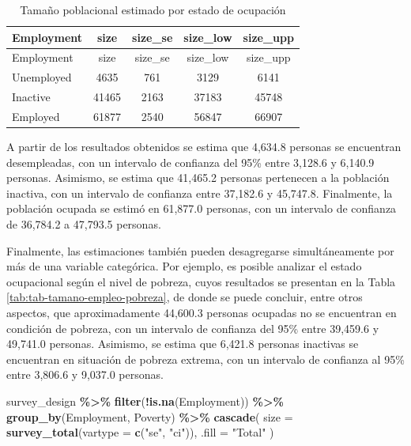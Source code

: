 \documentclass[
  spanish,
  12pt,
]{book}
\newenvironment{Shaded}{\begin{snugshade}}{\end{snugshade}}
\newcommand{\AttributeTok}[1]{\textcolor[rgb]{0.13,0.29,0.53}{#1}}
\newcommand{\FunctionTok}[1]{\textcolor[rgb]{0.13,0.29,0.53}{\textbf{#1}}}
\newcommand{\NormalTok}[1]{#1}
\newcommand{\SpecialCharTok}[1]{\textcolor[rgb]{0.81,0.36,0.00}{\textbf{#1}}}
\newcommand{\StringTok}[1]{\textcolor[rgb]{0.31,0.60,0.02}{#1}}
\begin{document}
\begin{longtable}[]{@{}lcccc@{}}
\caption{\label{tab:tab-tamano-empleo}Tamaño poblacional estimado por estado de ocupación}\tabularnewline
\toprule\noalign{}
Employment & size & size\_se & size\_low & size\_upp \\
\midrule\noalign{}
\endfirsthead
\toprule\noalign{}
Employment & size & size\_se & size\_low & size\_upp \\
\midrule\noalign{}
\endhead
\bottomrule\noalign{}
\endlastfoot
Unemployed & 4635 & 761 & 3129 & 6141 \\
Inactive & 41465 & 2163 & 37183 & 45748 \\
Employed & 61877 & 2540 & 56847 & 66907 \\
\end{longtable}

A partir de los resultados obtenidos se estima que 4,634.8 personas se encuentran desempleadas, con un intervalo de confianza del 95\% entre 3,128.6 y 6,140.9 personas. Asimismo, se estima que 41,465.2 personas pertenecen a la población inactiva, con un intervalo de confianza entre 37,182.6 y 45,747.8. Finalmente, la población ocupada se estimó en 61,877.0 personas, con un intervalo de confianza de 36,784.2 a 47,793.5 personas.

Finalmente, las estimaciones también pueden desagregarse simultáneamente por más de una variable categórica. Por ejemplo, es posible analizar el estado ocupacional según el nivel de pobreza, cuyos resultados se presentan en la Tabla \ref{tab:tab-tamano-empleo-pobreza}, de donde se puede concluir, entre otros aspectos, que aproximadamente 44,600.3 personas ocupadas no se encuentran en condición de pobreza, con un intervalo de confianza del 95\% entre 39,459.6 y 49,741.0 personas. Asimismo, se estima que 6,421.8 personas inactivas se encuentran en situación de pobreza extrema, con un intervalo de confianza al 95\% entre 3,806.6 y 9,037.0 personas.

\begin{Shaded}
\begin{Highlighting}[]
\NormalTok{survey\_design }\SpecialCharTok{\%\textgreater{}\%}
  \FunctionTok{filter}\NormalTok{(}\SpecialCharTok{!}\FunctionTok{is.na}\NormalTok{(Employment)) }\SpecialCharTok{\%\textgreater{}\%}
  \FunctionTok{group\_by}\NormalTok{(Employment, Poverty) }\SpecialCharTok{\%\textgreater{}\%}
  \FunctionTok{cascade}\NormalTok{(}
    \AttributeTok{size =} \FunctionTok{survey\_total}\NormalTok{(}\AttributeTok{vartype =} \FunctionTok{c}\NormalTok{(}\StringTok{"se"}\NormalTok{, }\StringTok{"ci"}\NormalTok{)),}
    \AttributeTok{.fill =} \StringTok{"Total"}
\NormalTok{  )}
\end{Highlighting}
\end{Shaded}
\end{document}
